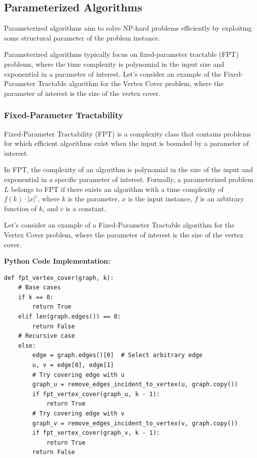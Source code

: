 \documentclass[12pt]{book} %
\begin{document}
\subsection{Parameterized Algorithms}

Parameterized algorithms aim to solve NP-hard problems efficiently by exploiting some structural parameter of the problem instance.

Parameterized algorithms typically focus on fixed-parameter tractable (FPT) problems, where the time complexity is polynomial in the input size and exponential in a parameter of interest. Let's consider an example of the Fixed-Parameter Tractable algorithm for the Vertex Cover problem, where the parameter of interest is the size of the vertex cover.

\subsubsection{Fixed-Parameter Tractability}

Fixed-Parameter Tractability (FPT) is a complexity class that contains problems for which efficient algorithms exist when the input is bounded by a parameter of interest.

In FPT, the complexity of an algorithm is polynomial in the size of the input and exponential in a specific parameter of interest. Formally, a parameterized problem \(L\) belongs to FPT if there exists an algorithm with a time complexity of \(f(k) \cdot |x|^c\), where \(k\) is the parameter, \(x\) is the input instance, \(f\) is an arbitrary function of \(k\), and \(c\) is a constant.

Let's consider an example of a Fixed-Parameter Tractable algorithm for the Vertex Cover problem, where the parameter of interest is the size of the vertex cover.

\textbf{Python Code Implementation:}
\FloatBarrier
\begin{lstlisting}
def fpt_vertex_cover(graph, k):
    # Base cases
    if k == 0:
        return True
    elif len(graph.edges()) == 0:
        return False
    # Recursive case
    else:
        edge = graph.edges()[0]  # Select arbitrary edge
        u, v = edge[0], edge[1]
        # Try covering edge with u
        graph_u = remove_edges_incident_to_vertex(u, graph.copy())
        if fpt_vertex_cover(graph_u, k - 1):
            return True
        # Try covering edge with v
        graph_v = remove_edges_incident_to_vertex(v, graph.copy())
        if fpt_vertex_cover(graph_v, k - 1):
            return True
        return False
\end{lstlisting}
\FloatBarrier
\end{document}
